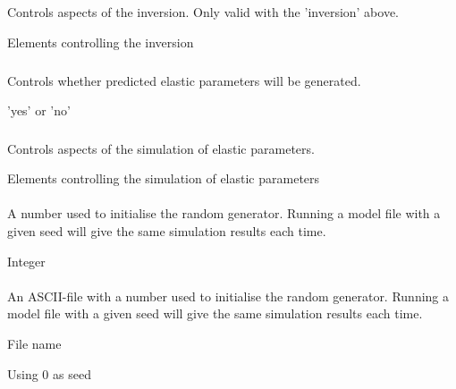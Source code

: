\subsection{}  
 \slist
   \item \Description Controls aspects of the inversion. Only valid with the  'inversion' above.
   \item \Argument Elements controlling the inversion
   \item \Default
 \elist

\subsubsection{}  
 \slist
   \item \Description Controls whether predicted elastic parameters will be generated.
   \item \Argument 'yes' or 'no'
   \item \Default
 \elist

\subsubsection{}  
 \slist
   \item \Description Controls aspects of the simulation of elastic parameters.
   \item \Argument Elements controlling the simulation of elastic parameters
 \elist



\paragraph{}  
 \slist
   \item \Description A number used to initialise the random generator. Running a model file with a given seed will give the same simulation results each time.
   \item \Argument Integer
   \item {}
 \elist

\paragraph{}  
 \slist
   \item \Description An ASCII-file with a number used to initialise the random generator. Running a model file with a given seed will give the same simulation results each time.
   \item \Argument File name
   \item \Default Using 0 as seed
 \elist


